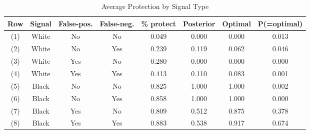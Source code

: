 \begin{table}[H]\centering \footnotesize \caption{Average Protection by Signal Type} \begin{tabular}{cccccccc} \hline \hline
\textbf{Row}&\textbf{Signal}&\textbf{False-pos.}&\textbf{False-neg.}&\textbf{\% protect}& \textbf{Posterior} & \textbf{Optimal} & \textbf{P(=optimal)} \\ \hline
(1)&White&No&No&0.049&0.000&0.000&0.013\\
(2)&White&No&Yes&0.239&0.119&0.062&0.046\\
(3)&White&Yes&No&0.280&0.000&0.000&0.000\\
(4)&White&Yes&Yes&0.413&0.110&0.083&0.001\\
(5)&Black&No&No&0.825&1.000&1.000&0.002\\
(6)&Black&No&Yes&0.858&1.000&1.000&0.000\\
(7)&Black&Yes&No&0.809&0.512&0.875&0.378\\
(8)&Black&Yes&Yes&0.883&0.538&0.917&0.674\\
\hline \end{tabular} \end{table}
